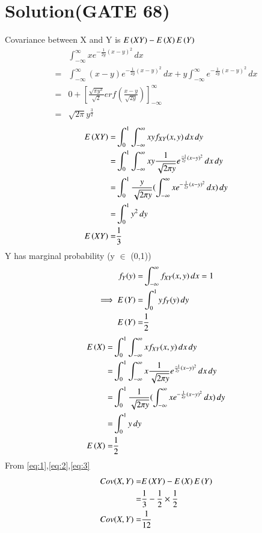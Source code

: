 \documentclass[journal,12pt,twocolumn]{IEEEtran}
\begin{document}
\section*{\textbf{Solution(GATE 68)}}
Covariance between X and Y is $E\left(XY\right)-E\left(X\right)E\left(Y\right)$\\
\begin{align}
  &\int_{-\infty}^{\infty}xe^{-\frac{1}{2y}(x-y)^2}\,dx\\
  =&\int_{-\infty}^{\infty}(x-y)e^{-\frac{1}{2y}(x-y)^2}\,dx+y\int_{-\infty}^{\infty}e^{-\frac{1}{2y}(x-y)^2}\,dx\\
  =&0+[\frac{\sqrt{\pi y^3}}{\sqrt{2}}erf(\frac{x-y}{\sqrt{2y}})]_{-\infty}^{\infty}\\
  =&\sqrt{2\pi}y^\frac{3}{2}
\end{align}
\begin{align}
    E\left(XY\right)=&\int_{0}^{1}\int_{-\infty}^{\infty}xy f_{XY}(x,y)\,dx\,dy\\
    =&\int_{0}^{1}\int_{-\infty}^{\infty}xy\frac{1}{\sqrt{2\pi y}}e^{\frac{-1}{2y}(x-y)^2}\,dx \,dy\\
    =&\int_{0}^{1}\frac{y}{\sqrt{2\pi y}}(\int_{-\infty}^{\infty}xe^{-\frac{1}{2y}(x-y)^2}\,dx)\,dy\\
    =&\int_{0}^{1}y^2 \,dy\\
     E\left(XY\right)=&\frac{1}{3} \label{eq:1}
    \end{align}
Y has marginal probability (y $\in$ (0,1))
\begin{align}
    f_Y(y)=&\int_{-\infty}^{\infty}f_{XY}(x,y)\,dx =1\\
    \implies E\left(Y\right)=&\int_{0}^{1} y f_{Y}(y)\,dy\\
    E\left(Y\right)=&\frac{1}{2} \label{eq:2}
\end{align}
\begin{align}
 E\left(X\right)=&\int_{0}^{1}\int_{-\infty}^{\infty}x f_{XY}(x,y)\,dx\,dy\\
    =&\int_{0}^{1}\int_{-\infty}^{\infty}x\frac{1}{\sqrt{2\pi y}}e^{\frac{-1}{2y}(x-y)^2}\,dx \,dy\\
     =&\int_{0}^{1}\frac{1}{\sqrt{2\pi y}}(\int_{-\infty}^{\infty}xe^{-\frac{1}{2y}(x-y)^2}\,dx)\,dy\\
    =&\int_{0}^{1}y\,dy\\
E\left(X\right)=&\frac{1}{2} \label{eq:3}
\end{align}
From \eqref{eq:1},\eqref{eq:2},\eqref{eq:3}
\begin{align}
Cov(X,Y)=&E\left(XY\right)-E\left(X\right)E\left(Y\right)\\
       =&\frac{1}{3}-\frac{1}{2}\times \frac{1}{2}\\
Cov(X,Y)=&\frac{1}{12}
\end{align}
\end{document}
